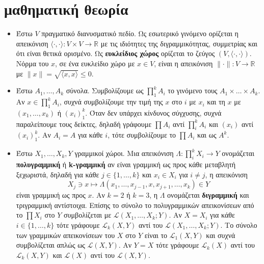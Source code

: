 \section{μαθηματική θεωρία}

\begin{itemize}
    \item Έστω $V$ πραγματικό διανυσματικό πεδίο. Ως εσωτερικό γινόμενο ορίζεται η απεικόνιση $\langle\cdot,\cdot\rangle:V\times V \rightarrow \mathbb{R}$ με τις ιδιότητες της διγραμμικότητας, συμμετρίας και ότι είναι θετικά ορισμένο. Ως \textbf{ευκλείδιος χώρος} ορίζεται το ζεύγος $\left(V, \langle\cdot,\cdot\rangle\right)$. Νόρμα του $x$, σε ένα ευκλείδιο χώρο με $x \in V$, είναι η απεικόνιση $\|\cdot\|:V\rightarrow \mathbb{R}$ με $\|x\| = \sqrt{\langle x, x \rangle} \leq 0$.
    
    \item \noindent Έστω $A_1, \ldots, A_k$ σύνολα. Συμβολίζουμε ως $\prod _1^{k} A_i$ το γινόμενο τους $A_1 \times \ldots \times A_k$.
    Αν $x \in \prod _1^k A_i$, συχνά συμβολίζουμε την τιμή της $x$ στο $i$ με $x_i$ και τη $x$ με $\left(x_1, \ldots, x_k\right)$ ή $\left(x_i\right)_1^k$. Όταν δεν υπάρχει κίνδυνος σύγχυσης, συχνά παραλείπουμε τους δείκτες, δηλαδή γράφουμε $\prod A_i$ αντί $\prod_i^k A_i$ και $\left(x_i\right)$ αντί $\left(x_i\right)_1^k$. Αν $A_i = A$ για κάθε $i$, τότε συμβολίζουμε το $\prod A_i$ και ως $A^k$.

    \item Έστω $X_1,\ldots,X_k,Y$ γραμμικοί χώροι. Μια απεικόνιση $ \Lambda: \prod_i^k X_i \rightarrow Y$ ονομάζεται \textbf{πολυγραμμική} ή \textbf{k-γραμμική} αν είναι γραμμική ως προς κάθε μεταβλητή ξεχωριστά, δηλαδή για κάθε $j \in \{1, \ldots, k\}$ και $x_i \in X_i $ για $i \neq j$, η απεικόνιση
    \begin{equation*}
        X_j \ni x \mapsto \Lambda\left(x_1, \ldots , x_{j-1}, x, x_{j+1}, \dots, x_k\right) \in Y
    \end{equation*}
    είναι γραμμική ως προς $x$. Αν $k = 2$ ή $k = 3$, η $\Lambda$ ονομάζεται \textbf{διγραμμική} και τριγραμμική αντίστοιχα. Επίσης το σύνολο το πολυγραμμικών απεικονίσεων από το $\prod X_i$ στο $Y$ συμβολίζεται με $\mathcal{L}\left(X_1,\ldots,X_k; Y\right)$. Αν $X = X_i$ για κάθε $i \in \{1,\ldots,k\}$ τότε γράφουμε $\mathcal{L}_k(X, Y)$ αντί του $\mathcal{L}\left(X_1,\ldots,X_k;Y\right)$. Το σύνολο των γραμμικών απεικονίσεων του $X$ στο $Y$ είναι το $\mathcal{L}_1(X, Y)$ και συχνά συμβολίζεται απλώς ως $\mathcal{L}(X, Y)$. Αν $Y = X$ τότε γράφουμε $\mathcal{L}_k(X)$ αντί του $\mathcal{L}_k(X, Y)$ και $\mathcal{L}(X)$ αντί του $\mathcal{L}(X, Y)$.


\end{itemize}
